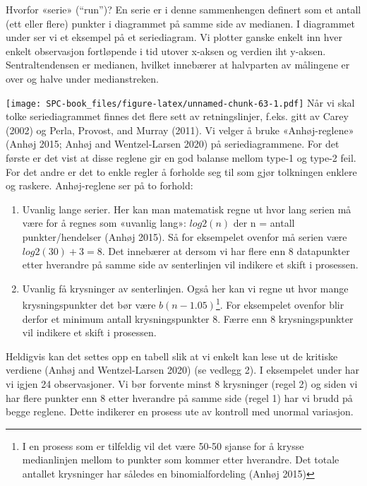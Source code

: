 \documentclass[
]{book}
\providecommand{\tightlist}{%
  \setlength{\itemsep}{0pt}\setlength{\parskip}{0pt}}
\begin{document}
Hvorfor «serie» (``run'')? En serie er i denne sammenhengen definert som et antall (ett eller flere) punkter i diagrammet på samme side av medianen. I diagrammet under ser vi et eksempel på et seriediagram. Vi plotter ganske enkelt inn hver enkelt observasjon fortløpende i tid utover x-aksen og verdien iht y-aksen. Sentraltendensen er medianen, hvilket innebærer at halvparten av målingene er over og halve under medianstreken.

\texttt{[image: SPC-book\_files/figure-latex/unnamed-chunk-63-1.pdf]}
Når vi skal tolke seriediagrammet finnes det flere sett av retningslinjer, f.eks. gitt av Carey (2002) og Perla, Provost, and Murray (2011). Vi velger å bruke «Anhøj-reglene» (Anhøj 2015; Anhøj and Wentzel-Larsen 2020) på seriediagrammene. For det første er det vist at disse reglene gir en god balanse mellom type-1 og type-2 feil. For det andre er det to enkle regler å forholde seg til som gjør tolkningen enklere og raskere. Anhøj-reglene ser på to forhold:

\begin{enumerate}
\def\labelenumi{\arabic{enumi}.}
\tightlist
\item
  Uvanlig lange serier. Her kan man matematisk regne ut hvor lang serien må være for å regnes som «uvanlig lang»: \(log2(n)\) der n = antall punkter/hendelser (Anhøj 2015). Så for eksempelet ovenfor må serien være \(log2(30)+3=8\). Det innebærer at dersom vi har flere enn 8 datapunkter etter hverandre på samme side av senterlinjen vil indikere et skift i prosessen.
\item
  Uvanlig få krysninger av senterlinjen. Også her kan vi regne ut hvor mange krysningspunkter det bør være \(b(n-1.05)\)\footnote{I en prosess som er tilfeldig vil det være 50-50 sjanse for å krysse medianlinjen mellom to punkter som kommer etter hverandre. Det totale antallet krysninger har således en binomialfordeling (Anhøj 2015)}. For eksempelet ovenfor blir derfor et minimum antall krysningspunkter 8. Færre enn 8 krysningspunkter vil indikere et skift i prosessen.
\end{enumerate}

Heldigvis kan det settes opp en tabell slik at vi enkelt kan lese ut de kritiske verdiene (Anhøj and Wentzel-Larsen 2020) (se vedlegg 2). I eksempelet under har vi igjen 24 observasjoner. Vi bør forvente minst 8 krysninger (regel 2) og siden vi har flere punkter enn 8 etter hverandre på samme side (regel 1) har vi brudd på begge reglene. Dette indikerer en prosess ute av kontroll med unormal variasjon.
\end{document}
